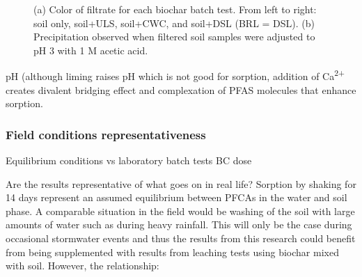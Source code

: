 \begin{figure}[tbh]
\hfill
{}
\caption{(a) Color of filtrate for each biochar batch test. From left to right: soil only, soil+ULS, soil+CWC, and soil+DSL (BRL = DSL). (b) Precipitation observed when filtered soil samples were adjusted to pH 3 with 1 M acetic acid.}
\label{fig:DOC_tubes}
\end{figure}

pH (although liming raises pH which is not good for sorption, addition of Ca\textsuperscript{2+} creates divalent bridging effect and complexation of PFAS molecules that enhance sorption. 

\subsubsection{Field conditions representativeness}

Equilibrium conditions vs laboratory batch tests
BC dose

Are the results representative of what goes on in real life? Sorption by shaking for 14 days represent an assumed equilibrium between PFCAs in the water and soil phase. A comparable situation in the field would be washing of the soil with large amounts of water such as during heavy rainfall. This will only be the case during occasional stormwater events and thus the results from this research could benefit from being supplemented with results from leaching tests using biochar mixed with soil. However, the relationship:

